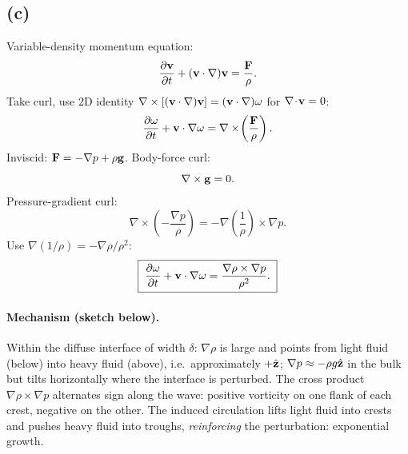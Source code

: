 \documentclass[11pt]{article}
\newcommand{\pd}[2]{\frac{\partial #1}{\partial #2}}
\begin{document}
\subsection*{(c)}

Variable-density momentum equation:
\[ \pd{\vb v}{t} + (\vb v\cdot\nabla)\vb v = \frac{\vb F}{\rho}. \]
Take curl, use 2D identity $\nabla\times[(\vb v\cdot\nabla)\vb v]=(\vb v\cdot\nabla)\omega$ for $\nabla\!\cdot\!\vb v=0$:
\[ \pd{\omega}{t} + \vb v\cdot\nabla\omega = \nabla\times\!\left(\frac{\vb F}{\rho}\right). \]
Inviscid: $\vb F = -\nabla p + \rho\vb g$. Body-force curl:
\[ \nabla\times\vb g = 0. \]
Pressure-gradient curl:
\[ \nabla\times\!\left(-\frac{\nabla p}{\rho}\right) = -\nabla\!\left(\frac{1}{\rho}\right)\!\times\nabla p. \]
Use $\nabla(1/\rho)=-\nabla\rho/\rho^2$:
\[ \boxed{\;\pd{\omega}{t} + \vb v\cdot\nabla\omega = \frac{\nabla\rho\times\nabla p}{\rho^2}.\;} \]

\paragraph{Mechanism (sketch below).} Within the diffuse interface of width $\delta$: $\nabla\rho$ is large and points from light fluid (below) into heavy fluid (above), i.e.\ approximately $+\hat{\vb z}$; $\nabla p\approx -\rho g\hat{\vb z}$ in the bulk but tilts horizontally where the interface is perturbed. The cross product $\nabla\rho\times\nabla p$ alternates sign along the wave: positive vorticity on one flank of each crest, negative on the other. The induced circulation lifts light fluid into crests and pushes heavy fluid into troughs, \emph{reinforcing} the perturbation: exponential growth.

\begin{center}
\end{center}
\end{document}
